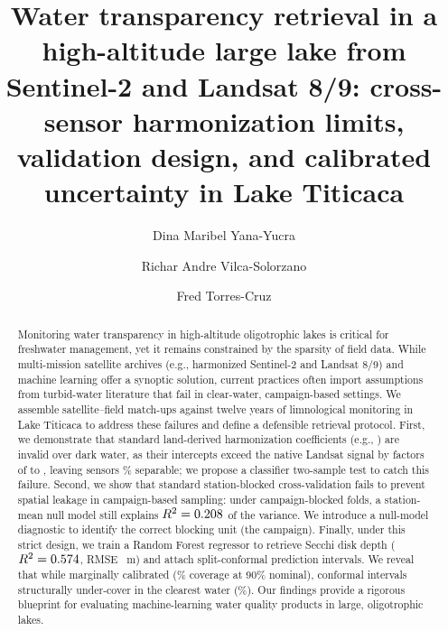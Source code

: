 \documentclass[final,5p,times,twocolumn,authoryear]{elsarticle}
\begin{document}
\begin{frontmatter}

\title{Water transparency retrieval in a high-altitude large lake from
Sentinel-2 and Landsat 8/9: cross-sensor harmonization limits, validation
design, and calibrated uncertainty in Lake Titicaca}

\author[unap]{Dina Maribel Yana-Yucra}
\author[unap]{Richar Andre Vilca-Solorzano}
\author[unap]{Fred Torres-Cruz}

\begin{abstract}
Monitoring water transparency in high-altitude oligotrophic lakes is critical for freshwater management, yet it remains constrained by the sparsity of field data. While multi-mission satellite archives (e.g., harmonized Sentinel-2 and Landsat 8/9) and machine learning offer a synoptic solution, current practices often import assumptions from turbid-water literature that fail in clear-water, campaign-based settings. We assemble \numMatchupsTotal{} satellite--field match-ups against twelve years of limnological monitoring in Lake Titicaca to address these failures and define a defensible retrieval protocol. First, we demonstrate that standard land-derived harmonization coefficients (e.g., \citealp{Roy2016}) are invalid over dark water, as their intercepts exceed the native Landsat signal by factors of \numRoyRatioGreen{} to \numRoyRatioNir{}, leaving sensors \numSensorAccAll\% separable; we propose a classifier two-sample test to catch this failure. Second, we show that standard station-blocked cross-validation fails to prevent spatial leakage in campaign-based sampling: under campaign-blocked folds, a station-mean null model still explains $R^2=0.208$ of the variance. We introduce a null-model diagnostic to identify the correct blocking unit (the campaign). Finally, under this strict design, we train a Random Forest regressor to retrieve Secchi disk depth ($R^2=0.574$, RMSE \numHeadlineRmse~m) and attach split-conformal prediction intervals. We reveal that while marginally calibrated (\numConformalCovNineZero\% coverage at 90\% nominal), conformal intervals structurally under-cover in the clearest water (\numConformalCovClearest\%). Our findings provide a rigorous blueprint for evaluating machine-learning water quality products in large, oligotrophic lakes.
\end{abstract}


\end{frontmatter}
\end{document}
